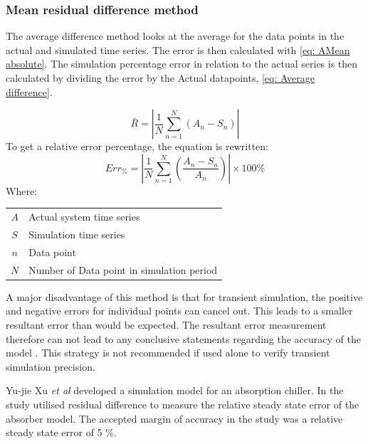  		\subsubsection{Mean residual difference method}
 			The average difference method looks at the average for the data points in the actual and simulated time series.  The error is then calculated with \cref{eq: AMean absolute}. The simulation percentage error in relation to the actual series is then calculated by dividing the error by the Actual datapoints, \cref{eq: Average difference}.
 			
 			\begin{equation}
 			\label{eq: AMean absolute}
 			\bar{R} = \left| \dfrac{1}{N} \sum_{n=1}^{N}{ \left( A_{n} - S_{n}\right)}  \right|
 			\end{equation}
To get a relative error percentage, the equation is rewritten:	
 			\begin{equation}
 				\label{eq: Average difference}
 				Err_{\%} = \left| \dfrac{1}{N} \sum_{n=1}^{N}{ \left(\dfrac{ A_{n} - S_{n}}{A_n}\right)}  \right| \times 100 \%
 			\end{equation}
 			Where: \par 
 				\begin{table}[h!]
 					\centering
 					\begin{tabular}{cl}
 						$A$ & Actual system time series \\
 						$S$ & Simulation time series \\
 						$n$ & Data point \\
 						$N$ & Number of Data point in simulation period \\
 					\end{tabular} 
 				\end{table}	
 			A major disadvantage of this method is that for transient simulation, the positive and negative errors for individual points can cancel out. This leads to a smaller resultant error than would be expected. The resultant error measurement therefore can not lead to any conclusive statements regarding the accuracy of the model \cite{sarin2010comparing}.  This strategy is not recommended if used alone to verify transient simulation precision. 
 			\par 
 						
 			Yu-jie Xu \textit{et al} \cite{xu2016modeling} developed a simulation model for an absorption chiller. In the study \cite{xu2016modeling} utilised  residual difference to measure the relative steady state error of the absorber model. The accepted margin of accuracy in the study was a relative steady state error of 5 \%. 
 			
